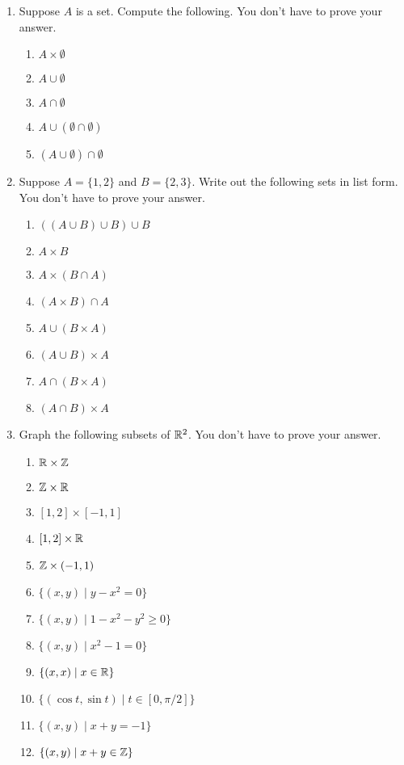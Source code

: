 \probsec{~\ref{sec:prod-union-inters}}
\begin{enumerate}
  \item Suppose $A$ is a set. Compute the following. You don't have to prove your answer.
\begin{enumerate}
    \item $A \times \emptyset$
    \item $A \cup \emptyset$
    \item $A \cap \emptyset$
    \item $A \cup (\emptyset \cap \emptyset)$
    \item $(A \cup \emptyset) \cap \emptyset$
\end{enumerate}

  \item Suppose $A = \{1, 2\}$ and $B = \{2, 3\}$. Write out the following sets in list form. You don't have to prove your answer.
\begin{enumerate}
    \item $((A \cup B) \cup B) \cup B$
    \item $A \times B$
    \item $A \times (B \cap A)$
    \item $(A \times B) \cap A$
    \item $A \cup (B \times A)$
    \item $(A \cup B) \times A$
    \item $A \cap (B \times A)$
    \item $(A \cap B) \times A$
\end{enumerate}

  \item Graph the following subsets of $\mathbb{R}^2$. You don't have to prove your answer.
\begin{enumerate}
    \item $\mathbb{R} \times \mathbb{Z}$
    \item $\mathbb{Z} \times \mathbb{R}$
    \item $[1,2] \times [-1,1]$
    \item $[1,2] \times \mathbb{R}$
    \item $\mathbb{Z} \times (-1,1)$
    \item $\{(x, y) \mid y - x^2 = 0\}$
    \item $\{(x, y) \mid 1 - x^2 - y^2 \geq 0\}$
    \item $\{(x, y) \mid x^2 - 1 = 0\}$
    \item $\{(x, x) \mid x \in \mathbb{R}\}$
    \item $\{(\cos t, \sin t) \mid t \in [0, \pi/2]\}$
    \item $\{(x, y) \mid x + y = -1\}$
    \item $\{(x, y) \mid x + y \in \mathbb{Z}\}$
\end{enumerate}


\end{enumerate}
